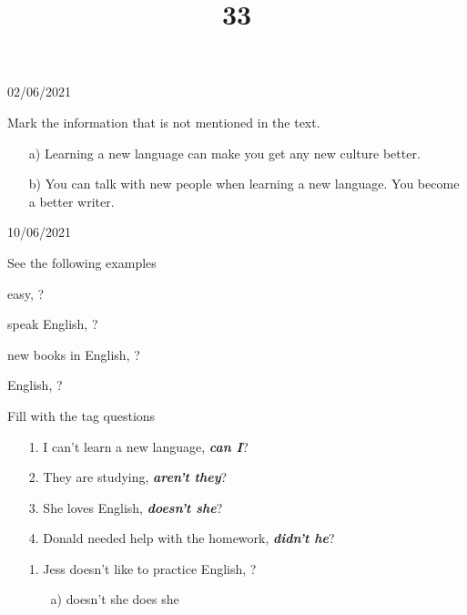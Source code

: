 \documentclass{SchoolBook}
\begin{document}
\begin{day}{02/06/2021}
\begin{enumerate}
            \itemc[2.] Mark the information that is not mentioned in the text. \normalfont
            \begin{enumerate}[nosep]
                \item[a)] Learning a new language can make you get any new culture better.
                \item[b)] You can talk with new people when learning a new language.
                 You become a better writer.
            \end{enumerate}
        \end{enumerate}
    \end{day}
    
    \begin{day}{10/06/2021}
        \title{3}{See the following examples}
        
          easy,  ?
        
          speak English,  ?
        
         new books in English, ?
        
          English,  ?
        
        \title{3}{Fill with the tag questions}
        
        \begin{enumerate}
            \item[1.] I can't learn a new language, \textbf{\it can I}?
            \item[2.] They are studying, \textbf{\it aren't they}?
            \item[3.] She loves English, \textbf{\it doesn't she}?
            \item[4.] Donald needed help with the homework, \textbf{\it didn't he}?
        \end{enumerate}
        
        \begin{enumerate}
            \item[1.] Jess doesn't like to practice English, \uline{\hspace{2cm}}?
            \begin{enumerate}
                \item[a)] doesn't she
                \itemc[b)] does she
            \end{enumerate}
            

\end{enumerate}
\end{day}
\end{document}
